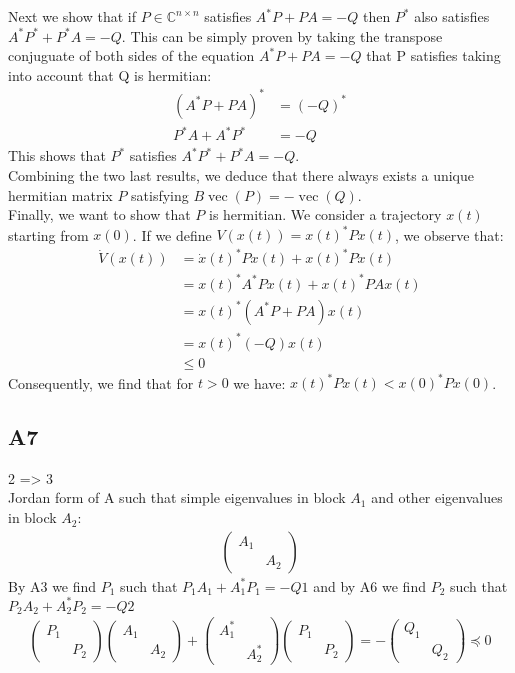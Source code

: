 \documentclass[11pt]{article}
\DeclareMathOperator{\vect}{vec}
\DeclareMathOperator{\vect}{vec}
\newcommand{\complex}{\mathbb{C}} %
\begin{document}
Next we show that if $P\in\complex^{n\times n}$ satisfies $A^*P+PA=-Q$ then $P^*$ also satisfies $A^*P^*+P^*A=-Q$. This can be simply proven by taking the transpose conjuguate of both sides of the equation $A^*P+PA=-Q$ that P satisfies taking into account that Q is hermitian:
\begin{align*}
    (A^*P+PA)^*&=(-Q)^*\\
    P^*A+A^*P^*&=-Q
\end{align*}
This shows that $P^*$ satisfies $A^*P^*+P^*A=-Q$.\\
Combining the two last results, we deduce that there always exists a unique hermitian matrix $P$ satisfying $B\vect(P)=-\vect(Q)$.\\
Finally, we want to show that $P$ is hermitian. We consider a trajectory $x(t)$ starting from $x(0)$. If we define $V(x(t))=x(t)^*Px(t)$, we observe that:
\begin{align*}
    \dot{V}(x(t))&=\dot{x}(t)^*P x(t)+x(t)^*P\dot{x}(t)\\
    &=x(t)^*A^*P x(t)+x(t)^*P A x(t)\\
    &=x(t)^*(A^*P+P A) x(t)\\
    &=x(t)^*(-Q) x(t)\\
    &\leq 0
\end{align*}
Consequently, we find that for $t>0$ we have: $x(t)^*P x(t)< x(0)^*P x(0)$.
\subsection*{A7}
2 => 3\\
Jordan form of A such that simple eigenvalues in block $A_1$ and other eigenvalues in block $A_2$:
\begin{align*}
    \begin{pmatrix}
    A_1 & \\
    & A_2
    \end{pmatrix}
\end{align*}
By A3 we find $P_1$ such that $P_1A_1+A_1^*P_1=-Q1$ and by A6 we find $P_2$ such that $P_2A_2+A_2^*P_2=-Q2$
\begin{align*}
    \begin{pmatrix}
    P_1 & \\
    & P_2
    \end{pmatrix}
    \begin{pmatrix}
    A_1 & \\
    & A_2
    \end{pmatrix}
    +
    \begin{pmatrix}
    A_1^* & \\
    & A_2^*
    \end{pmatrix}
    \begin{pmatrix}
    P_1 & \\
    & P_2
    \end{pmatrix}=-
    \begin{pmatrix}
    Q_1 & \\
    & Q_2
    \end{pmatrix}\preceq 0
\end{align*}
\end{document}
